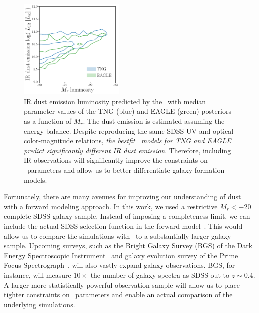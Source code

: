\begin{figure}
\begin{center}
    \includegraphics[width=0.45\textwidth]{figs/abc_Lir.pdf}
    \caption{\label{fig:lir}
    IR dust emission luminosity predicted by the \eda~with median parameter
    values of the TNG (blue) and EAGLE (green) posteriors as a function of
    $M_r$. The dust emission is estimated assuming the \cite{dacunha2008}
    energy balance.  Despite reproducing the same SDSS UV and optical
    color-magnitude relations, \emph{the bestfit \eda~models for TNG and EAGLE
    predict significantly different IR dust emission}. Therefore, including IR
    observations will significantly improve the constraints on \eda~parameters
    and allow us to better differentiate galaxy formation models.
    }
\end{center}
\end{figure}

Fortunately, there are many avenues for improving our understanding of dust
with a forward modeling approach. In this work, we used a restrictive $M_r <
-20$ complete SDSS galaxy sample. Instead of imposing a completeness limit, 
we can include the actual SDSS selection function in the forward 
model~\citep[\eg~][]{dickey2020}. This would allow us to compare the
simulations with \eda~to a substantially larger galaxy sample. Upcoming
surveys, such as the Bright Galaxy Survey (BGS) of the Dark Energy
Spectroscopic Instrument~\citep[DESI;][]{desicollaboration2016, ruiz-macias2020} 
and galaxy evolution survey of the Prime Focus
Spectrograph~\citep[PFS;][]{takada2014,tamura2016}, will also vastly expand galaxy
observations. BGS, for instance, will measure $10\times$ the number of galaxy
spectra as SDSS out to $z\sim0.4$. A larger more statistically
powerful observation sample will allow us to place tighter constraints on \eda~parameters
and enable an actual comparison of the underlying simulations. 

